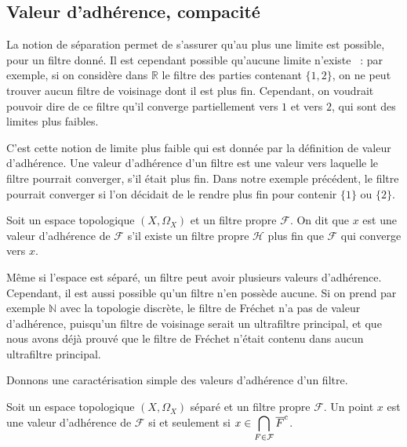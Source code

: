 \subsection{Valeur d'adhérence, compacité}

La notion de séparation permet de s'assurer qu'au plus une limite est possible,
pour un filtre donné. Il est cependant possible qu'aucune limite n'existe~ : par
exemple, si on considère dans $\mathbb R$ le filtre des parties contenant
$\{1,2\}$, on ne peut trouver aucun filtre de voisinage dont il est plus fin.
Cependant, on voudrait pouvoir dire de ce filtre qu'il converge partiellement
vers $1$ et vers $2$, qui sont des limites plus faibles.

C'est cette notion de limite plus faible qui est donnée par la définition de
valeur d'adhérence. Une valeur d'adhérence d'un filtre est une valeur vers
laquelle le filtre pourrait converger, s'il était plus fin. Dans notre exemple
précédent, le filtre pourrait converger si l'on décidait de le rendre plus fin
pour contenir $\{1\}$ ou $\{2\}$.

\begin{definition}
  Soit un espace topologique $(X,\Omega_X)$ et un filtre propre $\mathcal F$. On
  dit que $x$ est une valeur d'adhérence de $\mathcal F$ s'il existe un filtre
  propre $\mathcal H$ plus fin que $\mathcal F$ qui converge vers $x$.
\end{definition}

Même si l'espace est séparé, un filtre peut avoir plusieurs valeurs d'adhérence.
Cependant, il est aussi possible qu'un filtre n'en possède aucune. Si on prend
par exemple $\mathbb N$ avec la topologie discrète, le filtre de Fréchet n'a pas
de valeur d'adhérence, puisqu'un filtre de voisinage serait un ultrafiltre
principal, et que nous avons déjà prouvé que le filtre de Fréchet n'était
contenu dans aucun ultrafiltre principal.

Donnons une caractérisation simple des valeurs d'adhérence d'un filtre.

\begin{proposition}\label{prop.carac.adh}
  Soit un espace topologique $(X,\Omega_X)$ séparé et un filtre propre
  $\mathcal F$. Un point $x$ est une valeur d'adhérence de $\mathcal F$ si et
  seulement si $\displaystyle x\in \bigcap_{F\in\mathcal F} \overline{F}^{\mathrm c}$.
\end{proposition}

